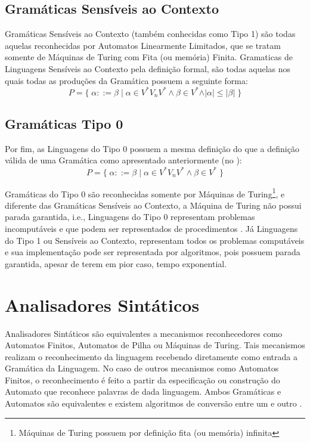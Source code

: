 {\subsection*{Gramáticas Sensíveis ao Contexto}

    Gramáticas Sensíveis ao Contexto (também conhecidas como Tipo 1) são
    todas aquelas reconhecidas por Automatos Linearmente Limitados,
    que se tratam somente de Máquinas de Turing com Fita (ou memória) Finita.
    Gramaticas de Linguagens Sensíveis ao Contexto pela definição formal,
    são todas aquelas nos quais todas as produções da Gramática possuem a seguinte forma:
    $$ P = \{\; \alpha ::= \beta \;|\; \alpha \in V^* V_n V^* \land \beta \in V^*
                \land \vert\alpha\vert \leq \vert\beta\vert \;\} $$


\subsection*{Gramáticas Tipo 0}

    Por fim,
    as Linguagens do Tipo 0 possuem a mesma definição do que a definição
    válida de uma Gramática como apresentado anteriormente (no
    ):
    $$ P = \{\; \alpha ::= \beta \;|\; \alpha \in V^* V_n V^* \land \beta \in V^* \;\} $$

    Gramáticas do Tipo 0 são reconhecidas somente por Máquinas de Turing\footnote{Máquinas
    de Turing possuem por definição fita (ou memória) infinita
    },
    e diferente das Gramáticas Sensíveis ao Contexto,
    a Máquina de Turing não possui parada garantida,
    i.e.,
    Linguagens do Tipo 0 representam problemas incomputáveis e
    que podem ser representados de procedimentos \cite{sipserBook}.
    Já Linguagens do Tipo 1 ou Sensíveis ao Contexto,
    representam todos os problemas computáveis e
    sua implementação pode ser representada por algoritmos,
    pois possuem parada garantida,
    apesar de terem em pior caso,
    tempo exponential.


\section{Analisadores Sintáticos}
\label{analisadoresSintaticos}

    Analisadores Sintáticos são equivalentes a mecanismos reconhecedores como Automatos Finitos,
    Automatos de Pilha ou Máquinas de Turing.
    Tais mecanismos realizam o reconhecimento da linguagem recebendo
    diretamente como entrada a Gramática da Linguagem.
    No caso de outros mecanismos como Automatos Finitos,
    o reconhecimento é feito a partir da especificação ou construção
    do Automato que reconhece palavras de dada linguagem.
    Ambos Gramáticas e
    Automatos são equivalentes e
    existem algoritmos de conversão entre um e
    outro \cite{hopcroftBook}.

}
